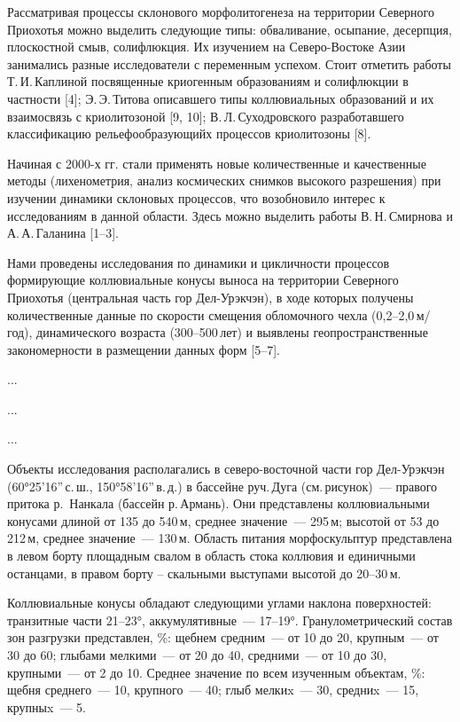  

\makeProcTitle
{}

Рассматривая процессы склонового морфолитогенеза на территории Северного Приохотья
можно выделить следующие типы: обваливание, осыпание, десерпция, плоскостной смыв, солифлюкция.
Их изучением на Северо-Востоке Азии занимались разные исследователи с переменным успехом.
Стоит отметить работы Т.\,И.\,Каплиной посвященные криогенным образованиям
и солифлюкции в частности [4]; Э.\,Э.\,Титова описавшего типы коллювиальных образований
и их взаимосвязь с криолитозоной [9, 10]; В.\,Л.\,Суходровского разработавшего классификацию рельефообразующийх процессов криолитозоны [8].

Начиная с 2000-х гг. стали применять новые количественные и качественные методы (лихенометрия, анализ космических снимков высокого разрешения) при изучении динамики склоновых процессов,
что возобновило интерес к исследованиям в данной области. Здесь можно выделить работы В.\,Н.\,Смирнова и А.\,А.\,Галанина [1--3].

Нами проведены исследования по динамики и цикличности процессов формирующие коллювиальные конусы выноса на территории Северного Приохотья (центральная часть гор Дел-Урэкчэн), в ходе которых получены количественные данные по скорости смещения обломочного чехла (0,2--2,0\,м/год), динамического возраста (300--500\,лет) и выявлены геопространственные закономерности в размещении данных форм [5--7].

...

...

...

Объекты исследования располагались в северо-восточной части гор Дел-Урэкчэн
(60°25’16”\,с.\,ш., 150°58’16”\,в.\,д.) в бассейне руч.\,Дуга (см.\,ри\-су\-нок)~--- правого
притока р. Нанкала (бассейн р.\,Армань). Они представлены коллювиальными конусами
длиной от 135 до 540\,м, среднее значение~--- 295\,м; высотой от 53 до 212\,м,
среднее значение~--- 130\,м. Область питания морфо\-скульптур представлена в левом
борту площадным свалом в область стока коллювия и единичными останцами, в правом
борту – скальными выступами высотой до 20–30\,м.



Коллювиальные конусы обладают следующими углами наклона поверхностей: транзитные
части 21–23°, аккумулятивные~--- 17–19°. Гранулометрический состав зон разгрузки
представлен, \%: щебнем средним~--- от 10 до 20, крупным~--- от 30 до 60; глыбами
мелкими~--- от 20 до 40, средними~--- от 10 до 30, крупными~--- от 2 до 10. Среднее
значение по всем изученным объектам, \%: щебня среднего~--- 10, крупного~--- 40;
глыб мелкиx~--- 30, средниx~--- 15, крупныx~--- 5.
\enlargethispage{\baselineskip}

